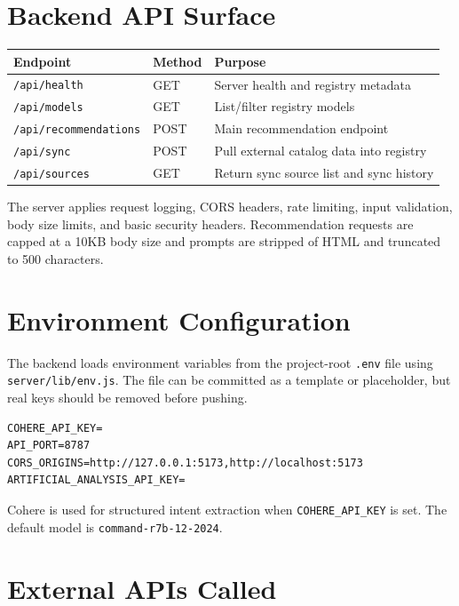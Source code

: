 \documentclass[11pt]{article}
\begin{document}
\section{Backend API Surface}

\begin{table}[h]
\centering
\begin{tabular}{lll}
\toprule
\textbf{Endpoint} & \textbf{Method} & \textbf{Purpose} \\
\midrule
\texttt{/api/health} & GET & Server health and registry metadata \\
\texttt{/api/models} & GET & List/filter registry models \\
\texttt{/api/recommendations} & POST & Main recommendation endpoint \\
\texttt{/api/sync} & POST & Pull external catalog data into registry \\
\texttt{/api/sources} & GET & Return sync source list and sync history \\
\bottomrule
\end{tabular}
\end{table}

The server applies request logging, CORS headers, rate limiting, input validation, body size limits, and basic security headers. Recommendation requests are capped at a 10KB body size and prompts are stripped of HTML and truncated to 500 characters.

\section{Environment Configuration}

The backend loads environment variables from the project-root \texttt{.env} file using \texttt{server/lib/env.js}. The file can be committed as a template or placeholder, but real keys should be removed before pushing.

\begin{lstlisting}[style=code]
COHERE_API_KEY=
API_PORT=8787
CORS_ORIGINS=http://127.0.0.1:5173,http://localhost:5173
ARTIFICIAL_ANALYSIS_API_KEY=
\end{lstlisting}

Cohere is used for structured intent extraction when \texttt{COHERE\_API\_KEY} is set. The default model is \texttt{command-r7b-12-2024}.

\section{External APIs Called}
\end{document}
